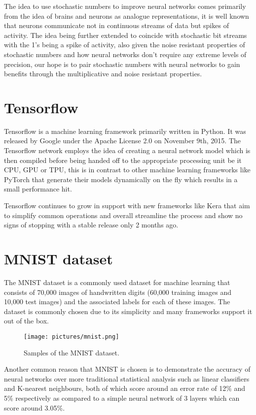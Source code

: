 \documentclass[a4paper,oneside,phd,etd]{BYUPhys}
\begin{document}
The idea to use stochastic numbers to improve neural networks comes primarily from the idea of brains and neurons as analogue representations, it is well known that neurons communicate not in continuous streams of data but spikes of activity. The idea being further extended to coincide with stochastic bit streams with the 1's being a spike of activity, also given the noise resistant properties of stochastic numbers and how neural networks don't require any extreme levels of precision, our hope is to pair stochastic numbers with neural networks to gain benefits through the multiplicative and noise resistant properties.

\section{Tensorflow}
Tensorflow\cite{tensorflow} is a machine learning framework primarily written in Python. It was released by Google under the Apache License 2.0 on November 9th, 2015. The Tensorflow network employs the idea of creating a neural network model which is then compiled before being handed off to the appropriate processing unit be it CPU, GPU or TPU, this is in contrast to other machine learning frameworks like PyTorch that generate their models dynamically on the fly which results in a small performance hit.

Tensorflow continues to grow in support with new frameworks like Kera that aim to simplify common operations and overall streamline the process and show no signs of stopping with a stable release only 2 months ago.

\section{MNIST dataset}
The MNIST dataset\cite{lecun-website} is a commonly used dataset for machine learning that consists of 70,000 images of handwritten digits (60,000 training images and 10,000 test images) and the associated labels for each of these images. The dataset is commonly chosen due to its simplicity and many frameworks support it out of the box.
\begin{figure}[H]
\centering
\texttt{[image: pictures/mnist.png]}
\caption{Samples of the MNIST dataset\cite{fig:mnist}.}
\label{fig:mnist}
\end{figure}

Another common reason that MNIST is chosen is to demonstrate the accuracy of neural networks over more traditional statistical analysis such as linear classifiers and K-nearest neighbours, both of which score around an error rate of 12\% and 5\% respectively\cite{lecun-98} as compared to a simple neural network of 3 layers which can score around 3.05\%\cite{lecun-98}.
\end{document}
